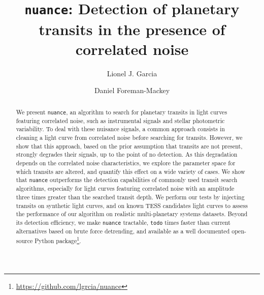 \documentclass{aastex631}
\newcommand{\nuance}{\texttt{nuance}}
\newcommand{\TODO}{\texttt{todo}}
\begin{document}
\title{\texttt{nuance}: Detection of planetary transits in the presence of correlated noise}

\author{Lionel J. Garcia}
\author{Daniel Foreman-Mackey}

\begin{abstract}
    We present \texttt{nuance}, an algorithm to search for planetary transits in light curves featuring correlated noise, such as instrumental signals and stellar photometric variability. To deal with these nuisance signals, a common approach consists in cleaning a light curve from correlated noise before searching for transits. However, we show that this approach, based on the prior assumption that transits are not present, strongly degrades their signals, up to the point of no detection. As this degradation depends on the correlated noise characteristics, we explore the parameter space for which transits are altered, and quantify this effect on a wide variety of cases. We show that \nuance{} outperforms the detection capabilities of commonly used transit search algorithms, especially for light curves featuring correlated noise with an amplitude three times greater than the searched transit depth. We perform our tests by injecting transits on synthetic light curves, and on known TESS candidates light curves to assess the performance of our algorithm on realistic multi-planetary systems datasets. Beyond its detection efficiency, we make \nuance{} tractable, \TODO{} times faster than current alternatives based on brute force detrending, and available as a well documented open-source Python package\footnote{\href{https://github.com/lgrcia/nuance}{https://github.com/lgrcia/nuance}}.
\end{abstract}
\end{document}
